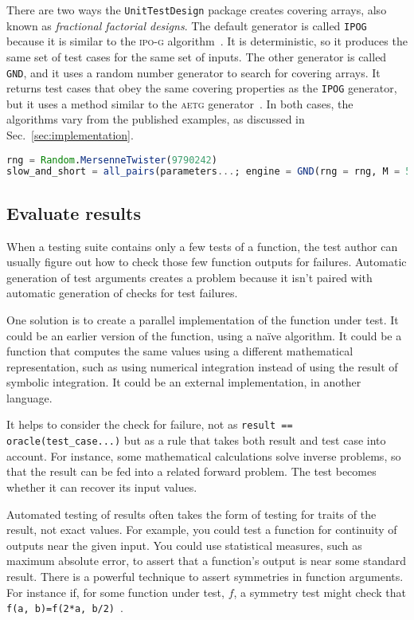 \documentclass{juliacon}
\newcommand{\utd}{\texttt{UnitTestDesign}\xspace}
\begin{document}
\vskip 6pt
There are two ways the \utd package creates covering arrays, also known as \emph{fractional factorial designs}. The default generator is called \verb|IPOG| because it is similar to the \textsc{ipo-g} algorithm~\cite{Lei2008-xt}. It is deterministic, so it produces the same set of test cases for the same set of inputs. The other generator is called \verb|GND|, and it uses a random number generator to search for covering arrays. It returns test cases that obey the same covering properties as the \verb|IPOG| generator, but it uses a method similar to the \textsc{aetg} generator~\cite{Cohen1997-lb}. In both cases, the algorithms vary from the published examples, as discussed in Sec.~\ref{sec:implementation}.

\begin{lstlisting}[language=Julia]
rng = Random.MersenneTwister(9790242)
slow_and_short = all_pairs(parameters...; engine = GND(rng = rng, M = 50))
\end{lstlisting}

\subsection{Evaluate results}\label{sec:results}

When a testing suite contains only a few tests of a function, the test author can usually figure out how to check those few function outputs for failures. Automatic generation of test arguments creates a problem because it isn't paired with automatic generation of checks for test failures.

\vskip 6pt
One solution is to create a parallel implementation of the function under test. It could be an earlier version of the function, using a na{\"i}ve algorithm. It could be a function that computes the same values using a different mathematical representation, such as using numerical integration instead of using the result of symbolic integration. It could be an external implementation, in another language.

\vskip 6pt
It helps to consider the check for failure, not as \verb|result == oracle(test_case...)| but as a rule that takes both result and test case into account. For instance, some mathematical calculations solve inverse problems, so that the result can be fed into a related forward problem. The test becomes whether it can recover its input values.

\vskip 6pt
Automated testing of results often takes the form of testing for traits of the result, not exact values. For example, you could test a function for continuity of outputs near the given input. You could use statistical measures, such as maximum absolute error, to assert that a function's output is near some standard result. There is a powerful technique to assert symmetries in function arguments. For instance if, for some function under test, $f$, a symmetry test might check that \verb|f(a, b)=f(2*a, b/2)|~\cite{Segura2016-qh}.
\end{document}
